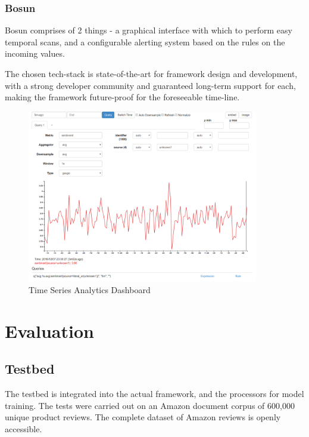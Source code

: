 \documentclass[conference]{IEEEtran}
\begin{document}
        \subsubsection{Bosun}
            Bosun comprises of 2 things - a graphical interface with which to perform easy temporal scans, and a configurable alerting system based on the rules on the incoming values\cite{bosun_repo}. 

        The chosen tech-stack is state-of-the-art for framework design and development, with a strong developer community and guaranteed long-term support for each, making the framework future-proof for the foreseeable time-line.

\begin{figure}[ht] \label{fig:time-series-analytics-dashboard}
    \centering
    \includegraphics[width=0.9\textwidth]{images/bosun_dash_1.png}
    \caption{Time Series Analytics Dashboard}
\end{figure}

\vspace{5mm}

\section{Evaluation}

    \subsection{Testbed}
        The testbed is integrated into the actual framework, and the processors for model training.
        The tests were carried out on an Amazon document corpus of 600,000 unique product reviews.
        The complete dataset of Amazon reviews is openly accessible\cite{amazon_datasets}.
\end{document}
